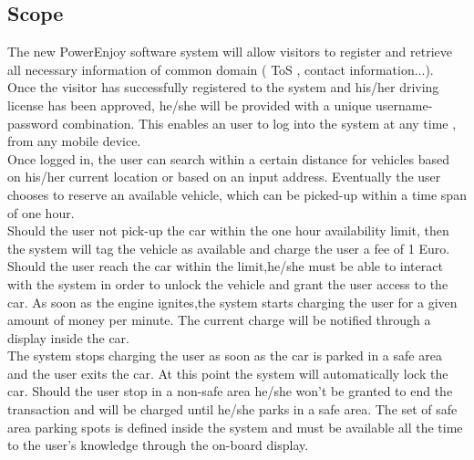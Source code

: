 \documentclass[11pt]{article}
\begin{document}
	 \subsection{\label{scope:1}Scope}
	The new PowerEnjoy software system will allow visitors to register and retrieve all necessary information of common domain ( ToS , contact information...). \\Once the visitor has successfully registered to the system and his/her driving license has been approved, he/she will be provided with a unique username-password combination. This enables an user to log into the system at any time , from any mobile device. \\Once logged in, the user can search within a certain distance for vehicles based on his/her current location or based on an input address. 
	Eventually the user chooses to reserve an available vehicle, which can be picked-up within a time span of one hour.\\ 
	Should the user not pick-up the car within the one hour availability limit, then the system will tag the vehicle as available and charge the user a fee of 1 Euro.\\
	Should the user reach the car within the limit,he/she must be able to  interact with the system in order to unlock the vehicle and grant the user access to the car.
	As soon as the engine ignites,the system starts charging the user for a given amount of money per minute. The current charge will be notified through a display inside the car.\\
	The system stops charging the user as soon as the car is parked in a safe area and the user exits the car. At this point the system will automatically lock the car.
	Should the user stop in a non-safe area he/she won't be granted to end the transaction and will be charged until  he/she parks in a safe area.
	The set of safe area parking spots is defined inside the system and must be available all the time to the user's knowledge through the on-board display.
	
\end{document}
